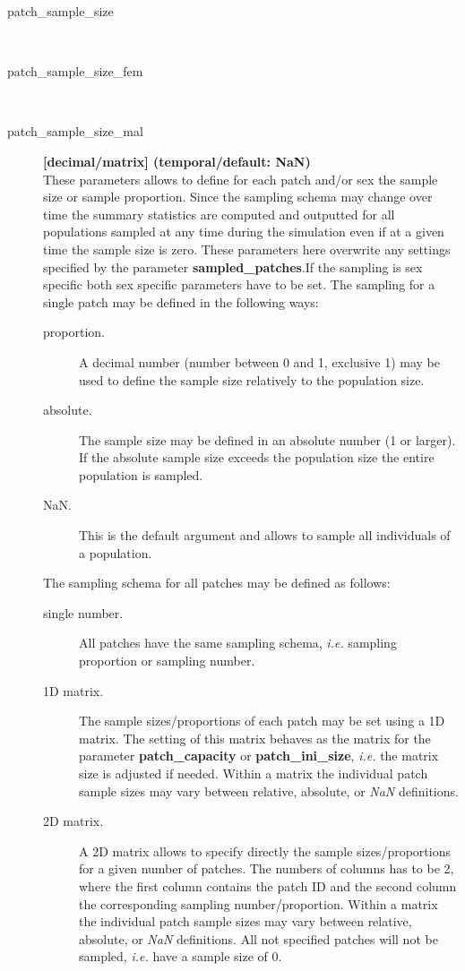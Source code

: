 \documentclass[letterpaper,12pt,oneside]{book}
\begin{document}
\begin{description}
\item[patch\_sample\_size]\hspace*{\fill}\\
\vspace{-9mm}
\item[patch\_sample\_size\_fem]\hspace*{\fill}\\
\vspace{-9mm}
\item[patch\_sample\_size\_mal]\textbf{[decimal/matrix] (temporal/default: NaN)}\\
These parameters allows to define for each patch and/or sex the sample size or sample proportion. Since the sampling schema may change over time the summary statistics are computed and outputted for all populations sampled at any time during the simulation even if at a given time the sample size is zero. These parameters here overwrite any settings specified by the parameter \textbf{sampled\_patches}.If the sampling is sex specific both sex specific parameters have to be set. The sampling for a single patch may be defined in the following ways:
\begin{description}
\item[proportion.] A decimal number (number between 0 and 1, exclusive 1) may be used to define the sample size relatively to the population size.
\item[absolute.] The sample size may be defined in an absolute number (1 or larger). If the absolute sample size exceeds the population size the entire population is sampled. 
\item[NaN.] This is the default argument and allows to sample all individuals of a population.
\end{description}

The sampling schema for all patches may be defined as follows:
\begin{description}
\item[single number.] All patches have the same sampling schema, \textit{i.e.} sampling proportion or sampling number.
\item[1D matrix.] The sample sizes/proportions of each patch may be set using a 1D matrix. The setting of this matrix behaves as the matrix for the parameter \textbf{patch\_capacity} or \textbf{patch\_ini\_size}, \textit{i.e.} the matrix size is adjusted if needed. Within a matrix the individual patch sample sizes may vary between relative, absolute, or \textit{NaN} definitions. 
\item[2D matrix.] A 2D matrix allows to specify directly the sample sizes/proportions for a given number of patches. The numbers of columns has to be 2, where the first column contains the patch ID and the second column the corresponding sampling number/proportion. Within a matrix the individual patch sample sizes may vary between relative, absolute, or \textit{NaN} definitions. All not specified patches will not be sampled, \textit{i.e.} have a sample size of 0.
\end{description}
\end{description}
\end{document}
